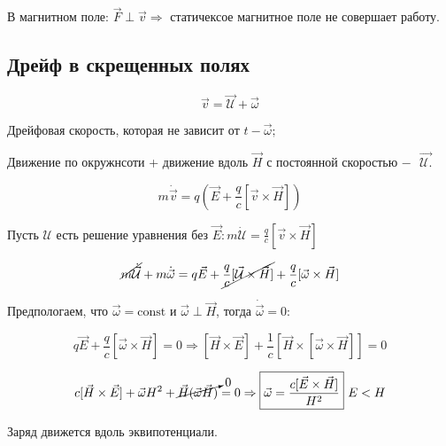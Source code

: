 В магнитном поле: $\vec{F}\perp\vec{v}\Rightarrow$ статичексое магнитное поле не совершает работу. 

\subsection*{Дрейф в скрещенных полях}


\[
\vec{v}=\vec{\mathcal{U}}+\vec{\omega}
\]

Дрейфовая скорость, которая не зависит от $t -\vec{\omega}; $

Движение по окружнсоти + движение вдоль $\vec{H}$ с постоянной скоростью $ - \text{ }\vec{\mathcal{U} .}$

\[
m\dot{\vec{v}}=q\left( \vec{E}+\frac{q}{c}[\vec{v}\times \vec{H}]  \right)
\]

Пусть $\mathcal{U}$ есть решение уравнения без $\vec{E}: m\dot{\mathcal{U}}=\frac{q}{c}[\vec{v}\times\vec{H}]$

\[
\cancel{m\dot{\vec{\mathcal{U}}}}+m\dot{\vec{\omega}}=q\vec{E}+\cancel{\frac{q}{c}[\vec{\mathcal{U}}\times \vec{H}]}+\frac{q}{c}[\vec{\omega} \times \vec{H}] 
\]

Предпологаем, что $\vec{\omega}=\mathrm{const} \text{ и } \vec{\omega}\perp\vec{H}$, тогда $\dot{\vec{\omega}}=0:$

\[
q\vec{E}+\frac{q}{c}[\vec{\omega}\times \vec{H}]=0\Rightarrow[\vec{H}\times \vec{E}]+\frac{1}{c}[\vec{H}\times [\vec{\omega}\times \vec{H}]]=0  
\]

\[
c[\vec{H}\times \vec{E}]+\vec{\omega}H^2+\cancelto{0}{\vec{H}(\vec{\omega}\vec{H})}=0\Rightarrow\boxed{\vec{\omega}=\frac{c[\vec{E}\times \vec{H}]}{H^2 }}\text{ } E<H
\]

Заряд движется вдоль эквипотенциали. 